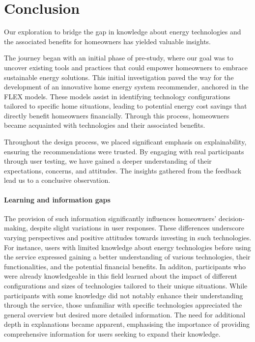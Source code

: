 \chapter{Conclusion}

Our exploration to bridge the gap in knowledge about energy technologies and the associated benefits for homeowners has yielded valuable insights. 

The journey began with an initial phase of pre-study, where our goal was to uncover existing tools and practices that could empower homeowners to embrace sustainable energy solutions. 
This initial investigation paved the way for the development of an innovative home energy system recommender, anchored in the FLEX models. 
These models assist in identifying technology configurations tailored to specific home situations, leading to potential energy cost savings that directly benefit homeowners financially. 
Through this process, homeowners became acquainted with technologies and their associated benefits. 

Throughout the design process, we placed significant emphasis on explainability, ensuring the recommendations were trusted.  
By engaging with real participants through user testing, we have gained a deeper understanding of their expectations, concerns, and attitudes. 
The insights gathered from the feedback lead us to a conclusive observation.


\subsubsection*{Learning and information gaps}

The provision of such information significantly influences homeowners' decision-making, despite slight variations in user responses. 
These differences underscore varying perspectives and positive attitudes towards investing in such technologies. 
For instance, users with limited knowledge about energy technologies before using the service expressed gaining a better understanding of various technologies, their functionalities, and the potential financial benefits.
In additon, participants who were already knowledgeable in this field learned about the impact of different configurations and sizes of technologies tailored to their unique situations. 
While participants with some knowledge did not notably enhance their understanding through the service, those unfamiliar with specific technologies appreciated the general overview but desired more detailed information. 
The need for additional depth in explanations became apparent, emphasising the importance of providing comprehensive information for users seeking to expand their knowledge. 


